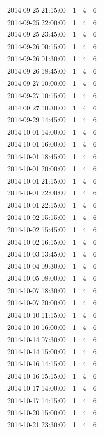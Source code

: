 \begin{tabular}{lrrr}
2014-09-25 21:15:00 & 1 & 4 & 6 \\
2014-09-25 22:00:00 & 1 & 4 & 6 \\
2014-09-25 23:45:00 & 1 & 4 & 6 \\
2014-09-26 00:15:00 & 1 & 4 & 6 \\
2014-09-26 01:30:00 & 1 & 4 & 6 \\
2014-09-26 18:45:00 & 1 & 4 & 6 \\
2014-09-27 10:00:00 & 1 & 4 & 6 \\
2014-09-27 10:15:00 & 1 & 4 & 6 \\
2014-09-27 10:30:00 & 1 & 4 & 6 \\
2014-09-29 14:45:00 & 1 & 4 & 6 \\
2014-10-01 14:00:00 & 1 & 4 & 6 \\
2014-10-01 16:00:00 & 1 & 4 & 6 \\
2014-10-01 18:45:00 & 1 & 4 & 6 \\
2014-10-01 20:00:00 & 1 & 4 & 6 \\
2014-10-01 21:15:00 & 1 & 4 & 6 \\
2014-10-01 22:00:00 & 1 & 4 & 6 \\
2014-10-01 22:15:00 & 1 & 4 & 6 \\
2014-10-02 15:15:00 & 1 & 4 & 6 \\
2014-10-02 15:45:00 & 1 & 4 & 6 \\
2014-10-02 16:15:00 & 1 & 4 & 6 \\
2014-10-03 13:45:00 & 1 & 4 & 6 \\
2014-10-04 09:30:00 & 1 & 4 & 6 \\
2014-10-05 08:00:00 & 1 & 4 & 6 \\
2014-10-07 18:30:00 & 1 & 4 & 6 \\
2014-10-07 20:00:00 & 1 & 4 & 6 \\
2014-10-10 11:15:00 & 1 & 4 & 6 \\
2014-10-10 16:00:00 & 1 & 4 & 6 \\
2014-10-14 07:30:00 & 1 & 4 & 6 \\
2014-10-14 15:00:00 & 1 & 4 & 6 \\
2014-10-16 14:15:00 & 1 & 4 & 6 \\
2014-10-16 15:15:00 & 1 & 4 & 6 \\
2014-10-17 14:00:00 & 1 & 4 & 6 \\
2014-10-17 14:15:00 & 1 & 4 & 6 \\
2014-10-20 15:00:00 & 1 & 4 & 6 \\
2014-10-21 23:30:00 & 1 & 4 & 6 \\

\end{tabular}
